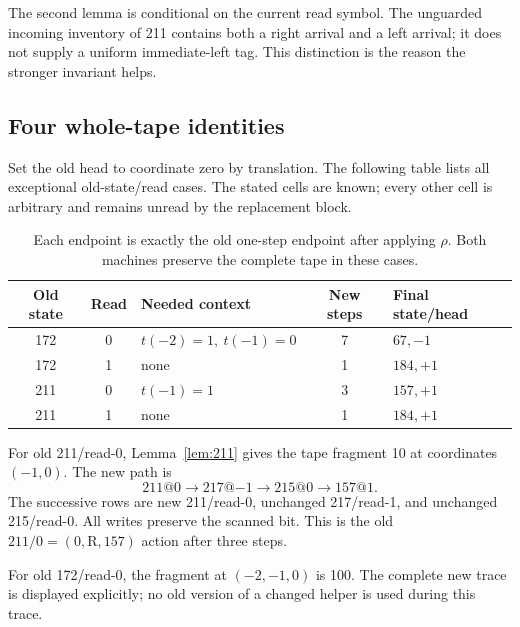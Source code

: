 \documentclass[11pt,letterpaper]{article}
\newcommand{\act}[3]{(#1,\mathrm{#2},#3)}
\begin{document}
The second lemma is conditional on the current read symbol. The unguarded
incoming inventory of 211 contains both a right arrival and a left arrival;
it does not supply a uniform immediate-left tag. This distinction is the
reason the stronger invariant helps.

\subsection{Four whole-tape identities}

Set the old head to coordinate zero by translation. The following table
lists all exceptional old-state/read cases. The stated cells are known;
every other cell is arbitrary and remains unread by the replacement block.

\begin{table}[ht]
\centering
\begin{tabular}{@{}cclcl@{}}
\toprule
Old state & Read & Needed context & New steps & Final state/head\\
\midrule
172 & 0 & \(t(-2)=1,\ t(-1)=0\) & 7 & \(67,-1\)\\
172 & 1 & none & 1 & \(184,+1\)\\
211 & 0 & \(t(-1)=1\) & 3 & \(157,+1\)\\
211 & 1 & none & 1 & \(184,+1\)\\
\bottomrule
\end{tabular}
\caption{Each endpoint is exactly the old one-step endpoint after applying
\(\rho\). Both machines preserve the complete tape in these cases.}
\label{tab:cases}
\end{table}

For old 211/read-0, Lemma~\ref{lem:211} gives the tape fragment 10 at
coordinates \((-1,0)\). The new path is
\[
211@0\longrightarrow217@{-1}\longrightarrow215@0\longrightarrow157@1.
\]
The successive rows are new 211/read-0, unchanged 217/read-1,
and unchanged 215/read-0. All writes preserve the scanned bit. This
is the old \(211/0=\act{0}{R}{157}\) action after three steps.

For old 172/read-0, the fragment at \((-2,-1,0)\) is 100. The complete
new trace is displayed explicitly; no old version of a changed helper
is used during this trace.
\end{document}
